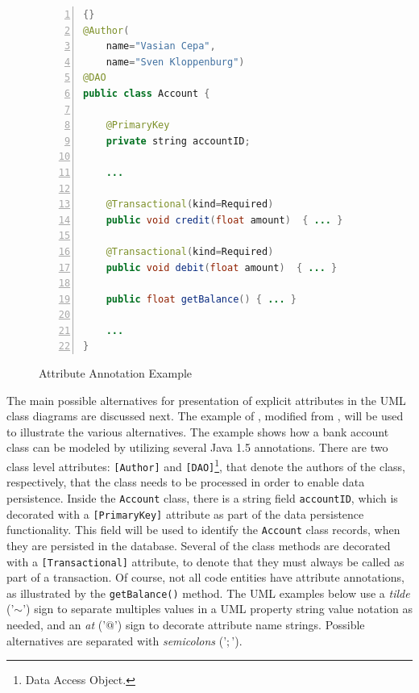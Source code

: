 \begin{figure}[ht]
	\centering
	\begin{minipage}[b]{8.5cm}
	\begin{center}	
		\begin{scriptsize}
\begin{lstlisting}[numbers=left,language=Java,frame=leftline,showstringspaces=false]{}
@Author(
    name="Vasian Cepa",
    name="Sven Kloppenburg")
@DAO
public class Account {
    
    @PrimaryKey
    private string accountID;
    
    ...

    @Transactional(kind=Required)
    public void credit(float amount)  { ... }

    @Transactional(kind=Required)
    public void debit(float amount)  { ... }
        
    public float getBalance() { ... }

    ...
}
\end{lstlisting}
		\end{scriptsize}
	\end{center}
	\caption{Attribute Annotation Example}
	\label{fig:app.example}
\end{minipage}	
\end{figure}

\noindent The main possible alternatives for presentation of
explicit attributes in the UML class diagrams are discussed next. The example of , modified from \cite{www.aop.metadata}, will be used to illustrate the various alternatives.  The example shows how a bank account class can be modeled by utilizing several Java 1.5 annotations. There are two class level attributes: \texttt{[Author]} and \texttt{[DAO]}\footnote{Data Access Object.}, that denote the authors of the class, respectively, that the class needs to be processed in order to enable data persistence. Inside the \texttt{Account} class, there is a string field \texttt{accountID}, which is decorated with a \texttt{[PrimaryKey]} attribute as part of the data persistence functionality. This field will be used to identify the \texttt{Account} class records, when they are persisted in the database. Several of the class methods are decorated with a \texttt{[Transactional]} attribute, to denote that they must always be called as part of a transaction. Of course, not all code entities have attribute annotations, as illustrated by the \texttt{getBalance()} method. The UML examples below use a \textit{tilde} ('$\sim$') sign to separate multiples values in a UML property string value notation as needed, and an \textit{at} ('$@$') sign to decorate attribute name strings. Possible alternatives are separated with \textit{semicolons} ('$;$').

